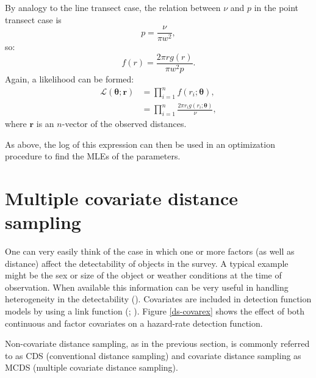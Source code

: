 By analogy to the line transect case, the relation between $\nu$ and $p$ in the point transect case is
\begin{equation*}
p=\frac{\nu}{\pi w^2},
\end{equation*}
so:
\begin{equation*}
f(r) = \frac{2 \pi r g(r)}{\pi w^2 p}.
\end{equation*}
Again, a likelihood can be formed:
\begin{align*}
\mathcal{L}(\bm{\theta}; \bm{r}) &= \prod_{i=1}^n f(r_i;\bm{\theta}),\\
&= \prod_{i=1}^n \frac{2 \pi r_i g(r_i;\bm{\theta})}{\nu},
\end{align*}
where $\bm{r}$ is an $n$-vector of the observed distances. 

As above, the log of this expression can then be used in an optimization procedure to find the MLEs of the parameters.

\section{Multiple covariate distance sampling}
\label{intro-ds-covar}

One can very easily think of the case in which one or more factors (as well as distance) affect the detectability of objects in the survey. A typical example might be the sex or size of the object or weather conditions at the time of observation. When available this information can be very useful in handling heterogeneity in the detectability (\cite[p. 88]{IDS}). Covariates are included in detection function models by using a link function (\cite{davidbthesis}; \cite{covpaper}\label{cor-7s10-2}\label{cor-8s3-1}). Figure \ref{ds-covarex} shows the effect of both continuous and factor covariates on a hazard-rate detection function.

\label{cor-r62}Non-covariate distance sampling, as in the previous section, is commonly referred to as CDS (conventional distance sampling) and covariate distance sampling as MCDS (multiple covariate distance sampling).

